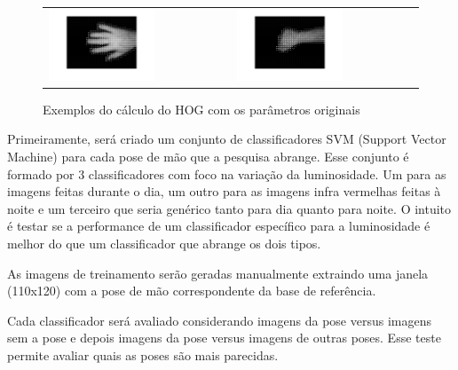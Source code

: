 \begin{figure}[H]
	\centering
	\begin{tabular}{p{} p{}}
		\vspace{1pt} \includegraphics[width=0.6\textwidth]{image/hog/0_01.png} &
		\vspace{0pt} \includegraphics[width=0.6\textwidth]{image/hog/7_01.png}
	\end{tabular}	
  	\caption{Exemplos do cálculo do HOG com os parâmetros originais}
  	\label{fig:hog_example1}
\end{figure}




Primeiramente, será criado um conjunto de classificadores SVM (Support Vector Machine) para cada pose de mão que a pesquisa abrange. Esse conjunto é formado por 3 classificadores com foco na variação da luminosidade. Um para as imagens feitas durante o dia, um outro para as imagens infra vermelhas feitas à noite e um terceiro que seria genérico tanto para dia quanto para noite. O intuito é testar se a performance de um classificador específico para a luminosidade é melhor do que um classificador que abrange os dois tipos.

As imagens de treinamento serão geradas manualmente extraindo uma janela (110x120) com a pose de mão correspondente da base de referência. 

Cada classificador será avaliado considerando imagens da pose versus imagens sem a pose e depois imagens da pose versus imagens de outras poses. Esse teste permite avaliar quais as poses são mais parecidas.

